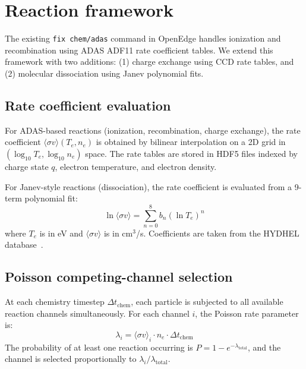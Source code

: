\documentclass[preprint,12pt]{elsarticle}
\begin{document}
\section{Reaction framework}
\label{sec:framework}

The existing \texttt{fix chem/adas} command in OpenEdge handles ionization and recombination
using ADAS ADF11 rate coefficient tables. We extend this framework with two additions:
(1) charge exchange using CCD rate tables, and (2) molecular dissociation using
Janev polynomial fits.

\subsection{Rate coefficient evaluation}

For ADAS-based reactions (ionization, recombination, charge exchange), the rate coefficient
$\langle\sigma v\rangle(T_e, n_e)$ is obtained by bilinear interpolation on a 2D grid in
$(\log_{10} T_e, \log_{10} n_e)$ space. The rate tables are stored in HDF5 files indexed by
charge state $q$, electron temperature, and electron density.

For Janev-style reactions (dissociation), the rate coefficient is evaluated from a 9-term
polynomial fit:
\begin{equation}
  \ln\langle\sigma v\rangle = \sum_{n=0}^{8} b_n (\ln T_e)^n
  \label{eq:janev}
\end{equation}
where $T_e$ is in eV and $\langle\sigma v\rangle$ is in cm$^3$/s. Coefficients are taken
from the HYDHEL database~\cite{Reiter1987,Janev1987}.

\subsection{Poisson competing-channel selection}

At each chemistry timestep $\Delta t_{\text{chem}}$, each particle is subjected to all
available reaction channels simultaneously. For each channel $i$, the Poisson rate parameter is:
\begin{equation}
  \lambda_i = \langle\sigma v\rangle_i \cdot n_e \cdot \Delta t_{\text{chem}}
\end{equation}
The probability of at least one reaction occurring is $P = 1 - e^{-\lambda_{\text{total}}}$,
and the channel is selected proportionally to $\lambda_i / \lambda_{\text{total}}$.

\end{document}
